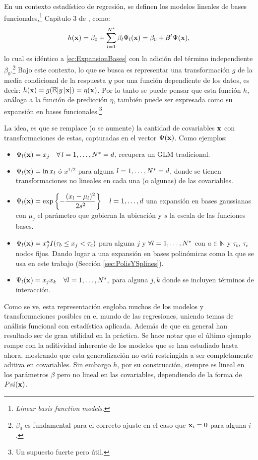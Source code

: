 \documentclass[../Main/Main.tex]{subfiles}
\begin{document}
En un contexto estadístico de regresión, se definen los modelos lineales de bases funcionales,\footnote{\textit{Linear basis function models}.} Capitulo 3 de \citet{bishop2006pattern}, como:
\begin{align} 
	h(\mathbf{x}) = \beta_0 + \sum_{l = 1}^{N^*} \beta_l\Psi_l(\mathbf{x}) = \beta_0 + \bm{\beta}^t\Psi(\mathbf{x}), \label{ec:LBFM}
\end{align}
lo cual es idéntico a \eqref{ec:ExpansionBases} con la adición del término independiente $\beta_0$.\footnote{$\beta_0$ es fundamental para el correcto ajuste en el caso que $\mathbf{x}_i = 0$ para alguna $i$.} Bajo este contexto, lo que se busca es representar una transformación $g$ de la media condicional de la respuesta $y$ por una función dependiente de los datos, es decir: $h(\mathbf{x}) = g(\mathbb{E}[y\,|\mathbf{x}]) = \eta(\mathbf{x})$. Por lo tanto se puede pensar que esta función $h$, análoga a la función de predicción $\eta$, también puede ser expresada como su expansión en bases funcionales.\footnote{Un supuesto fuerte pero útil.} 

La idea, es que se remplace (o se aumente) la cantidad de covariables $\mathbf{x}$ con transformaciones de estas, capturadas en el vector $\Psi(\mathbf{x})$. Como ejemplos:
\begin{itemize}[label = {}]
	\item $\Psi_l(\mathbf{x}) = x_j \quad \forall\,l = 1,\ldots,N^* = d$,  recupera un GLM tradicional.
	\item $\Psi_l(\mathbf{x}) = \ln x_l$ ó $x^{1/2}$ para alguna $l = 1,\ldots,N^* = d$, donde se tienen transformaciones no lineales en cada una (o algunas) de las covariables.
	\item $\Psi_l(\mathbf{x}) = \exp\left\{-\dfrac{(x_l - \mu_l)^2}{2s^2}\right\} \quad l = 1,\ldots,d$ una expansión en bases gaussianas con $\mu_j$ el parámetro que gobierna la ubicación y $s$ la escala de las funciones bases.
	\item $\Psi_l(\mathbf{x}) = x_j^aI( \tau_b \leq x_j <  \tau_c)$ para alguna $j$ y $\forall l =1,\ldots,N^*$ con $a\in \mathbb{N}$ y $\tau_b$, $\tau_c$ nodos fijos. Dando lugar a  una expansión en bases polinómicas como la que se usa en este trabajo (Sección \ref{sec:PolisYSplines}).
	\item $\Psi_l(\mathbf{x}) = x_jx_k  \quad \forall l = 1,\ldots,N^*,$  para alguna $j,k$ donde se incluyen términos de interacción. 
\end{itemize}

Como se ve, esta representación engloba muchos de los modelos y transformaciones posibles en el mundo de las regresiones, uniendo temas de análisis funcional con estadística aplicada. Además de que en general han resultado ser de gran utilidad en la práctica. Se hace notar que el último ejemplo rompe con la aditividad inherente de los modelos que se han estudiado hasta ahora, mostrando que esta generalización no está restringida a ser completamente aditiva en covariables. Sin embargo $h$, por su construcción, siempre es lineal en los parámetros $\beta$ pero no lineal en las covariables, dependiendo de la forma de $Psi(\mathbf{x})$.
\end{document}
